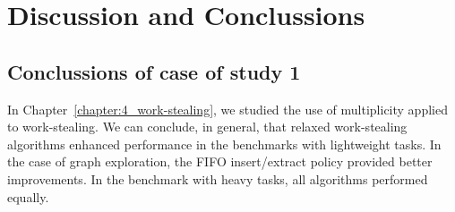 \chapter{Discussion and Conclussions}


\section{\label{sec:experiment-conclussions} Conclussions of case of study 1}

In Chapter~\ref{chapter:4_work-stealing}, we studied the use of multiplicity applied to work-stealing. We can conclude, in general, that relaxed work-stealing algorithms enhanced performance in the benchmarks with lightweight tasks. In the case of graph exploration, the FIFO insert/extract policy provided better improvements. In the benchmark with heavy tasks, all algorithms performed equally.
